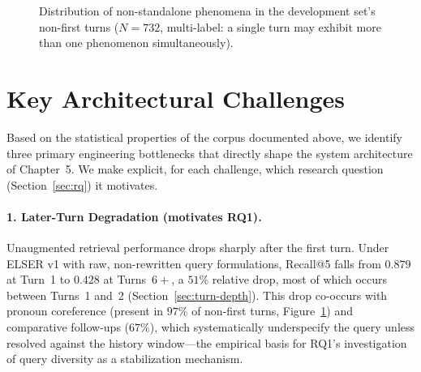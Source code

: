 \begin{figure}[h]
\centering
{}
\caption{Distribution of non-standalone phenomena in the development set's non-first turns ($N{=}732$, multi-label: a single turn may exhibit more than one phenomenon simultaneously).}
\label{fig:nonstandalone-en}
\end{figure}

\section{Key Architectural Challenges}
\label{sec:key-challenges}

Based on the statistical properties of the corpus documented above, we identify three primary engineering bottlenecks that directly shape the system architecture of Chapter~5. We make explicit, for each challenge, which research question (Section~\ref{sec:rq}) it motivates.

\paragraph{1. Later-Turn Degradation (motivates RQ1).}
Unaugmented retrieval performance drops sharply after the first turn. Under ELSER v1 with raw, non-rewritten query formulations, Recall@5 falls from $0.879$ at Turn~1 to $0.428$ at Turns~$6{+}$, a $51\%$ relative drop, most of which occurs between Turns~1 and~2 (Section~\ref{sec:turn-depth}). This drop co-occurs with pronoun coreference (present in $97\%$ of non-first turns, Figure~\ref{fig:nonstandalone-en}) and comparative follow-ups ($67\%$), which systematically underspecify the query unless resolved against the history window---the empirical basis for RQ1's investigation of query diversity as a stabilization mechanism.

